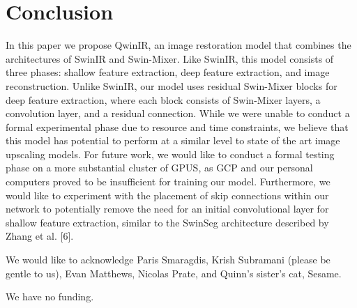 \documentclass{article}
\begin{document}
\section{Conclusion}

In this paper we propose QwinIR, an image restoration model that combines the architectures of SwinIR and Swin-Mixer. Like SwinIR, this model consists of three phases: shallow feature extraction, deep feature extraction, and image reconstruction. Unlike SwinIR, our model uses residual Swin-Mixer blocks for deep feature extraction, where each block consists of Swin-Mixer layers, a convolution layer, and a residual connection. While we were unable to conduct a formal experimental phase due to resource and time constraints, we believe that this model has potential to perform at a similar level to state of the art image upscaling models. For future work, we would like to conduct a formal testing phase on a more substantial cluster of GPUS, as GCP and our personal computers proved to be insufficient for training our model. Furthermore, we would like to experiment with the placement of skip connections within our network to potentially remove the need for an initial convolutional layer for shallow feature extraction, similar to the SwinSeg architecture described by Zhang et al. [6].

\begin{ack}
    We would like to acknowledge Paris Smaragdis, Krish Subramani (please be gentle to us), Evan Matthews, Nicolas Prate, and Quinn’s sister’s cat, Sesame.

    We have no funding.
\end{ack}


\end{document}

